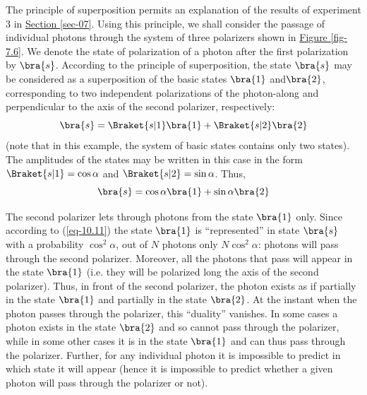 \documentclass[a4paper,sfsidenotes,colorlinks=true]{tufte-book}
\numberwithin{equation}{section}
\numberwithin{figure}{section}
\begin{document}
The  principle of superposition permits an
explanation of the results of experiment 3 in
\hyperref[sec-07]{Section \ref{sec-07}}. Using this principle, we
shall consider the passage of individual photons through the system of
three polarizers shown in \hyperref[fig-7.6]{Figure \ref{fig-7.6}}. We
denote the state of polarization of a photon after the first
polarization by $\bra{s}$. According to the principle of superposition, the
state $\bra{s}$ may be considered as a superposition of the basic states
$\bra{1}$ and$\bra{2}$, corresponding to two independent polarizations of the
photon-along and perpendicular to the axis of the second polarizer,
respectively:
\begin{equation}
\bra{s} = \Braket{s|1} \bra{1} + \Braket{s|2} \bra{2}
\label{eq-10.10}
\end{equation}
(note that in this example, the system of basic states contains only
two states). The amplitudes of the states may be written in this case
in the form $\Braket{s|1} = \cos \alpha$ and $\Braket{s|2} = \sin
\alpha$. Thus,
\begin{equation}
\bra{s} = \cos \alpha \bra{1} + \sin \alpha \bra{2}
\label{eq-10.11}
\end{equation}

The second polarizer lets through photons from the state $\bra{1}$
only. Since according to (\ref{eq-10.11}) the state $\bra{1}$ is
``represented'' in state $\bra{s}$ with a probability $\cos^{2}
\alpha$, out of $N$ photons only $N \cos^{2} \alpha$: photons will
pass through the second polarizer. Moreover, all the photons that pass
will appear in the state $\bra{1}$ (i.e. they will be polarized long the
axis of the second polarizer). Thus, in front of the second polarizer,
the photon exists as if partially in the state $\bra{1}$ and partially in
the state $\bra{2}$. At the instant when the photon passes through the
polarizer, this ``duality'' vanishes. In some cases a photon exists in
the state $\bra{2}$ and so cannot pass through the polarizer, while in some
other cases it is in the state $\bra{1}$ and can thus pass through the
polarizer. Further, for any individual photon it is impossible to
predict in which state it will appear (hence it is impossible to
predict whether a given photon will pass through the polarizer or
not).
\end{document}
